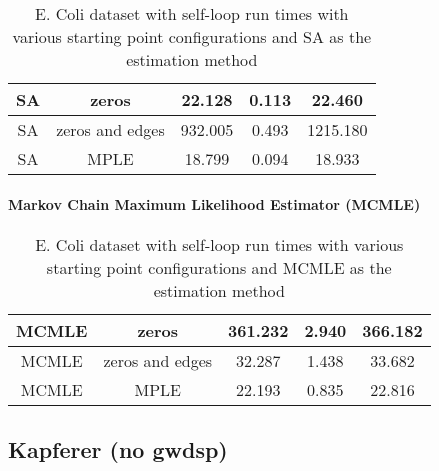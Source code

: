 \begin{table}[!ht]
\centering
\begin{tabular}{||c | c | c | c | c||}
 \hline
 SA & zeros & 22.128 & 0.113 & 22.460 \\
 \hline
 SA & zeros and edges & 932.005 & 0.493 & 1215.180 \\ 
 \hline
 SA & MPLE & 18.799 & 0.094 & 18.933 \\ 
 \hline
 \end{tabular}
 \label{t:ecoli2_sa}
 \caption{E. Coli dataset with self-loop run times with various starting point configurations and SA as the estimation method}
\end{table}

\paragraph{Markov Chain Maximum Likelihood Estimator (MCMLE)}

\begin{table}[!ht]
\centering
\begin{tabular}{||c | c | c | c | c||}
 \hline
 MCMLE & zeros & 361.232 & 2.940 & 366.182 \\  
 \hline
 MCMLE & zeros and edges & 32.287 & 1.438 & 33.682 \\ 
 \hline
 MCMLE & MPLE & 22.193 & 0.835 & 22.816 \\  
 \hline
\end{tabular}
\label{t:ecoli2}
\caption{E. Coli dataset with self-loop run times with various starting point configurations and MCMLE as the estimation method}
\end{table}

\subsection{Kapferer (no gwdsp)}

